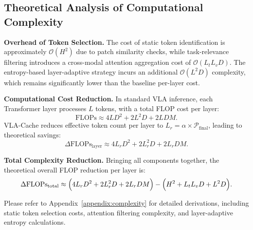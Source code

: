 \subsection{Theoretical Analysis of Computational Complexity}
\label{method:Computational_Complexity}
\noindent
\textbf{Overhead of Token Selection.} 
The cost of static token identification is approximately $\mathcal{O}(H^2)$ due to patch similarity checks, while task-relevance filtering introduces a cross-modal attention aggregation cost of $\mathcal{O}(L_t L_v D)$. The entropy-based layer-adaptive strategy incurs an additional $\mathcal{O}(L^2 D)$ complexity, which remains significantly lower than the baseline per-layer cost.

\noindent
\textbf{Computational Cost Reduction.} 
In standard VLA inference, each Transformer layer processes $L$ tokens, with a total FLOP cost per layer:
\begin{equation}
\label{eq:baseline_layer_flops}
\text{FLOPs} \approx 4 L D^2 + 2 L^2 D + 2 L D M.
\end{equation}
VLA-Cache reduces effective token count per layer to $L_r = \alpha \times \mathcal{P}_{\mathrm{final}}$, leading to theoretical savings:
\begin{equation}
\label{eq:reuse_saving}
\Delta \text{FLOPs}_{\mathrm{layer}} \approx 4 L_r D^2 + 2 L_r^2 D + 2 L_r D M.
\end{equation}


\noindent
\textbf{Total Complexity Reduction.} 
Bringing all components together, the theoretical overall FLOP reduction per layer is:
\begin{equation}
\label{eq:final_theoretical_gain}
\begin{aligned}
\Delta \text{FLOPs}_{\text{total}} 
\approx  \Bigl( 4 L_r D^2 + 2 L_r^2 D + 2 L_r D M \Bigr) - \Bigl( H^2 + L_t L_v D + L^2 D \Bigr).
\end{aligned}
\end{equation}

Please refer to Appendix~\ref{appendix:complexity} for detailed derivations, including static token selection costs, attention filtering complexity, and layer-adaptive entropy calculations.

